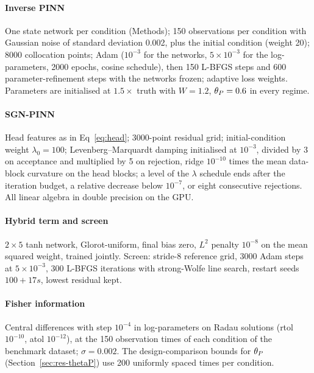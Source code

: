 \paragraph{Inverse PINN} One state network per condition (Methods); 150
observations per condition with Gaussian noise of standard deviation 0.002, plus
the initial condition (weight 20); 8000 collocation points; Adam ($10^{-3}$ for
the networks, $5\times10^{-3}$ for the log-parameters, 2000 epochs, cosine
schedule), then 150 L-BFGS steps and 600 parameter-refinement steps with the
networks frozen; adaptive loss weights. Parameters are initialised at
$1.5\times$ truth with $W=1.2$, $\theta_P=0.6$ in every regime.

\paragraph{SGN-PINN} Head features as in Eq~\eqref{eq:head}; 3000-point
residual grid; initial-condition weight $\lambda_0=100$; Levenberg--Marquardt
damping initialised at $10^{-3}$, divided by 3 on acceptance and multiplied by 5
on rejection, ridge $10^{-10}$ times the mean data-block curvature on the head
blocks; a level of the $\lambda$ schedule ends after the iteration budget, a
relative decrease below $10^{-7}$, or eight consecutive rejections. All linear
algebra in double precision on the GPU.

\paragraph{Hybrid term and screen} $2\times5$ tanh network, Glorot-uniform, final
bias zero, $L^2$ penalty $10^{-8}$ on the mean squared weight, trained jointly.
Screen: stride-8 reference grid, 3000 Adam steps at $5\times10^{-3}$, 300 L-BFGS
iterations with strong-Wolfe line search, restart seeds $100+17s$, lowest
residual kept.

\paragraph{Fisher information} Central differences with step $10^{-4}$ in
log-parameters on Radau solutions (rtol $10^{-10}$, atol $10^{-12}$), at the
150 observation times of each condition of the benchmark dataset;
$\sigma=0.002$. The design-comparison bounds for $\theta_P$
(Section~\ref{sec:res-thetaP}) use 200 uniformly spaced times per condition.

